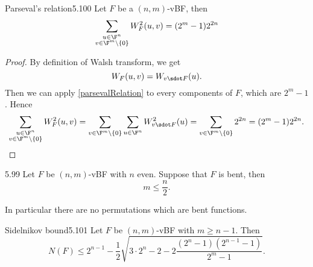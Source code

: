 \begin{defn}{Parseval's relation}{5.100}
	Let \(F\) be a \((n,m)\)-vBF, then
	\[
		\sum_{\substack{u\in\F^n\\v\in\F^m\setminus\{0\}}} W_F^2(u,v) = (2^m-1)2^{2n}
	\]
\end{defn}

\begin{proof}
	By definition of Walsh transform, we get
	\[
		W_F(u,v) = W_{v\sdot F}(u).
	\]
	Then we can apply \autoref{parsevalRelation} to every components of \(F\), which are \(2^m-1\). Hence
	\[
		\sum_{\substack{u\in\F^n\\v\in\F^m\setminus\{0\}}} W_F^2(u,v) = \sum_{v\in\F^m\setminus\{0\}}\sum_{u\in\F^n} W_{v\sdot F}^2(u) = \sum_{v \in \F^m\setminus\{0\}} 2^{2n} = (2^m-1)2^{2n}.\qedhere
	\]
\end{proof}

\begin{teor}{}{5.99}
	Let \(F\) be \((n,m)\)-vBF with \(n\) even. Suppose that \(F\) is bent, then
	\[
		m \le \frac{n}{2}.
	\]
\end{teor}

\begin{oss}
	In particular there are no permutations which are bent functions.
\end{oss}

\begin{teor}{Sidelnikov bound}{5.101}
	Let \(F\) be \((n,m)\)-vBF with \(m\ge n-1\). Then
	\[
		N(F) \le 2^{n-1} - \frac{1}{2}\sqrt{3\cdot 2^n - 2 - 2 \frac{(2^n-1)(2^{n-1}-1)}{2^m-1}}.
	\]
\end{teor}

